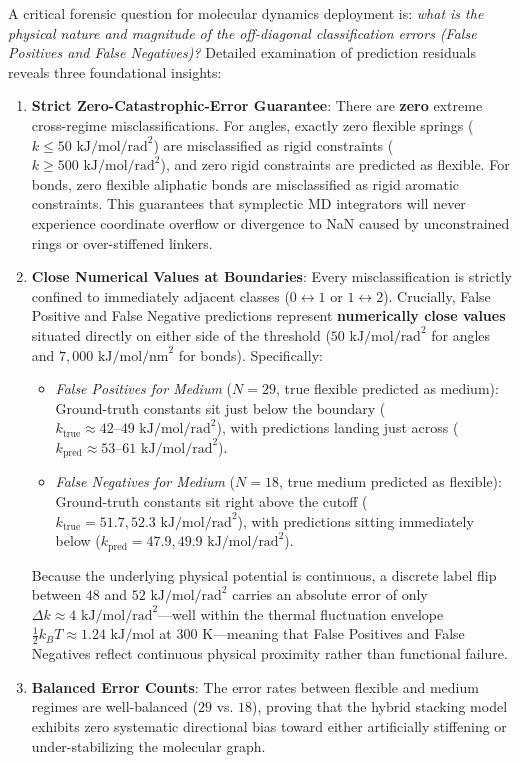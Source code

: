 \documentclass[11pt,a4paper]{article}
\begin{document}
A critical forensic question for molecular dynamics deployment is: \textit{what is the physical nature and magnitude of the off-diagonal classification errors (False Positives and False Negatives)?} Detailed examination of prediction residuals reveals three foundational insights:
\begin{enumerate}
    \item \textbf{Strict Zero-Catastrophic-Error Guarantee}: There are \textbf{zero} extreme cross-regime misclassifications. For angles, exactly zero flexible springs ($k \le 50\text{ kJ/mol/rad}^2$) are misclassified as rigid constraints ($k \ge 500\text{ kJ/mol/rad}^2$), and zero rigid constraints are predicted as flexible. For bonds, zero flexible aliphatic bonds are misclassified as rigid aromatic constraints. This guarantees that symplectic MD integrators will never experience coordinate overflow or divergence to NaN caused by unconstrained rings or over-stiffened linkers.
    \item \textbf{Close Numerical Values at Boundaries}: Every misclassification is strictly confined to immediately adjacent classes ($0 \leftrightarrow 1$ or $1 \leftrightarrow 2$). Crucially, False Positive and False Negative predictions represent \textbf{numerically close values} situated directly on either side of the threshold ($50\text{ kJ/mol/rad}^2$ for angles and $7{,}000\text{ kJ/mol/nm}^2$ for bonds). Specifically:
    \begin{itemize}
        \item \textit{False Positives for Medium} ($N = 29$, true flexible predicted as medium): Ground-truth constants sit just below the boundary ($k_{\text{true}} \approx 42\text{--}49\text{ kJ/mol/rad}^2$), with predictions landing just across ($k_{\text{pred}} \approx 53\text{--}61\text{ kJ/mol/rad}^2$).
        \item \textit{False Negatives for Medium} ($N = 18$, true medium predicted as flexible): Ground-truth constants sit right above the cutoff ($k_{\text{true}} = 51.7, 52.3\text{ kJ/mol/rad}^2$), with predictions sitting immediately below ($k_{\text{pred}} = 47.9, 49.9\text{ kJ/mol/rad}^2$).
    \end{itemize}
    Because the underlying physical potential is continuous, a discrete label flip between $48$ and $52\text{ kJ/mol/rad}^2$ carries an absolute error of only $\Delta k \approx 4\text{ kJ/mol/rad}^2$---well within the thermal fluctuation envelope $\frac{1}{2} k_B T \approx 1.24\text{ kJ/mol}$ at $300\text{ K}$---meaning that False Positives and False Negatives reflect continuous physical proximity rather than functional failure.
    \item \textbf{Balanced Error Counts}: The error rates between flexible and medium regimes are well-balanced ($29$ vs. $18$), proving that the hybrid stacking model exhibits zero systematic directional bias toward either artificially stiffening or under-stabilizing the molecular graph.
\end{enumerate}
\end{document}

